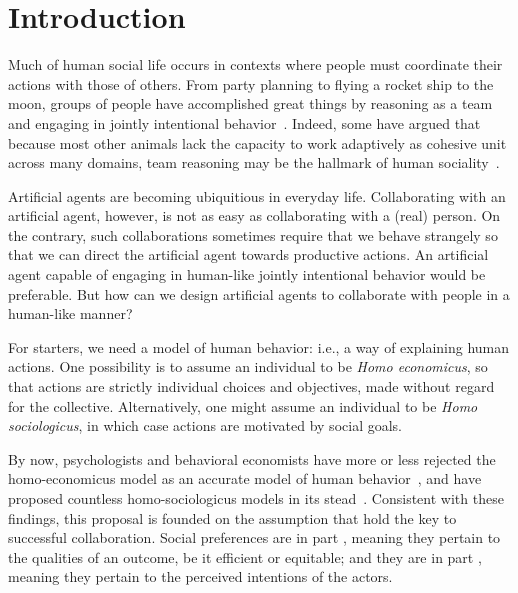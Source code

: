 
\section{Introduction}
\label{sec:intro}

Much of human social life occurs in contexts where people must
coordinate their actions with those of others.  From party planning to
flying a rocket ship to the moon, groups of people have accomplished
great things by reasoning as a team and engaging in jointly
intentional behavior~\cite{searle1995construction}.  Indeed, some have
argued that because most other animals lack the capacity to work
adaptively as cohesive unit across many domains, team reasoning may be
the hallmark of human sociality~\cite{tomasello2005understanding}.


Artificial agents are becoming ubiquitious in everyday life.
Collaborating with an artificial agent, however, is not as easy as
collaborating with a (real) person.  On the contrary, such
collaborations sometimes require that we behave strangely so that we
can direct the artificial agent towards productive actions.  An
artificial agent capable of engaging in human-like jointly intentional
behavior 
would be preferable.  But how can we design artificial agents to
collaborate with people in a human-like manner?

For starters, we need a model of human behavior: i.e., a way of
explaining human actions.  One possibility is to assume an individual
to be \emph{Homo economicus}, so that actions are strictly individual
choices and objectives, made without regard for the collective.
Alternatively, one might assume an individual to be \emph{Homo
  sociologicus}, in which case actions are motivated by social goals.

By now, psychologists and behavioral economists have more or less
rejected the homo-economicus model as an accurate model of human
behavior~\cite{Kahnemann, etc.}, and have proposed countless
homo-sociologicus models in its stead~\cite{ADD CITATIONS}.
%
Consistent with these findings, this proposal is founded on the
assumption that  hold the key to successful
collaboration.
%
Social preferences are in part , meaning they
pertain to the qualities of an outcome, be it efficient or equitable;
and they are in part , meaning they pertain to the
perceived intentions of the actors.

